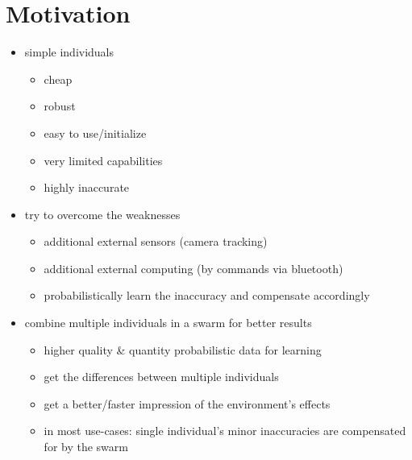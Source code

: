 \section{Motivation}
\begin{itemize}
	\item{simple individuals}
	\begin{itemize}
		\item{cheap}
		\item{robust}
		\item{easy to use/initialize}
		\item{very limited capabilities}
		\item{highly inaccurate}
	\end{itemize}
	\item{try to overcome the weaknesses}
	\begin{itemize}
		\item{additional external sensors (camera tracking)}
		\item{additional external computing (by commands via bluetooth)}
		\item{probabilistically learn the inaccuracy and compensate accordingly}
	\end{itemize}
	\item{combine multiple individuals in a swarm for better results}
	\begin{itemize}
		\item{higher quality \& quantity probabilistic data for learning}
		\item{get the differences between multiple individuals}
		\item{get a better/faster impression of the environment's effects}
		\item{in most use-cases: single individual's minor inaccuracies are compensated for by the swarm}
	\end{itemize}
\end{itemize}